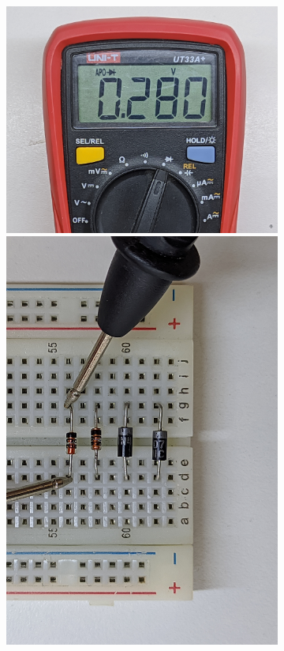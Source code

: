 \documentclass[chaptersright]{informeutn}
\begin{document}
\begin{figure}[!ht]
\begin{subfigure}[b]{1\textwidth}
\begin{minipage}[b]{0.24\textwidth}
          \includegraphics[width=1\textwidth]{pictures/mult_diod-3d.jpg}
        \end{minipage}
        \begin{minipage}[b]{0.24\textwidth}
          \centering
          \includegraphics[angle=-90, width=1\textwidth]{pictures/prot_diod-4d.jpg}

\end{minipage}
\end{subfigure}
\end{figure}
\end{document}
